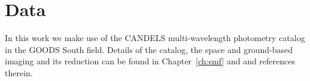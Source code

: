 \section{Data}\label{merger-sec:data}
In this work we make use of the CANDELS multi-wavelength photometry catalog in the GOODS South field. Details of the catalog, the space and ground-based imaging and its reduction can be found in Chapter~\ref{ch:smf} and \citet{Guo:2013ig} and references therein.

%
%
%
